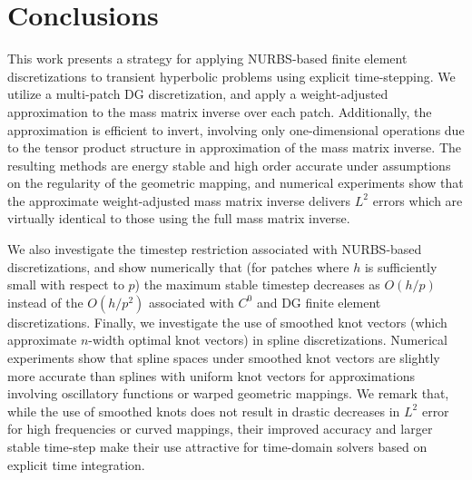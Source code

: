 \documentclass[preprint,10pt]{elsarticle}
\begin{document}
\section{Conclusions}
\label{sec:conc}

This work presents a strategy for applying NURBS-based finite element discretizations to transient hyperbolic problems using explicit time-stepping.  We utilize a multi-patch DG discretization, and apply a weight-adjusted approximation to the mass matrix inverse over each patch.  Additionally, the approximation is efficient to invert, involving only one-dimensional operations due to the tensor product structure in approximation of the mass matrix inverse.  The resulting methods are energy stable and high order accurate under assumptions on the regularity of the geometric mapping, and numerical experiments show that the approximate weight-adjusted mass matrix inverse delivers $L^2$ errors which are virtually identical to those using the full mass matrix inverse.   

We also investigate the timestep restriction associated with NURBS-based discretizations, and show numerically that (for patches where $h$ is sufficiently small with respect to $p$) the maximum stable timestep decreases as $O(h/p)$ instead of the $O(h/p^2)$ associated with $C^0$ and DG finite element discretizations.  Finally, we investigate the use of smoothed knot vectors (which approximate $n$-width optimal knot vectors) in spline discretizations.  Numerical experiments show that spline spaces under smoothed knot vectors are slightly more accurate than splines with uniform knot vectors for approximations involving oscillatory functions or warped geometric mappings.  We remark that, while the use of smoothed knots does not result in drastic decreases in $L^2$ error for high frequencies or curved mappings, their improved accuracy and larger stable time-step make their use attractive for time-domain solvers based on explicit time integration.  
\end{document}
